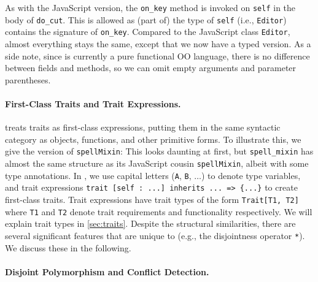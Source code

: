 As with the JavaScript version, the \lstinline{on_key} method is invoked on
\lstinline{self} in the body of \lstinline{do_cut}. This is allowed as (part of)
the type of \lstinline{self} (i.e., \lstinline{Editor}) contains the signature
of \lstinline{on_key}. Compared to the JavaScript class
\lstinline{Editor}, almost everything stays the same, except that we now have
a typed version. As a side note, since \sedel is currently a pure functional OO
language, there is no difference between fields and methods, so we can omit
empty arguments and parameter parentheses.

\paragraph{First-Class Traits and Trait Expressions.}

\sedel treats traits as first-class expressions, putting them in the same
syntactic category as objects, functions, and other primitive forms. To
illustrate this, we give the \sedel version of \lstinline{spellMixin}:
This looks daunting at first, but \lstinline{spell_mixin} has almost the same structure as
its JavaScript cousin \lstinline{spellMixin}, albeit with
some type annotations. In \sedel, we use capital letters (\lstinline{A}, \lstinline{B}, $\dots$) to denote type variables, and trait
expressions \lstinline$trait [self : ...] inherits ... => {...}$ to create
first-class traits. Trait expressions have trait
types of the form \lstinline{Trait[T1, T2]} where \lstinline{T1} and \lstinline{T2} denote trait requirements and functionality respectively.
We will explain trait types in \cref{sec:traits}. Despite the structural similarities, there are several significant
features that are unique to \sedel (e.g., the disjointness operator \lstinline{*}).
We discuss these in the following.



\paragraph{Disjoint Polymorphism and Conflict Detection.}

